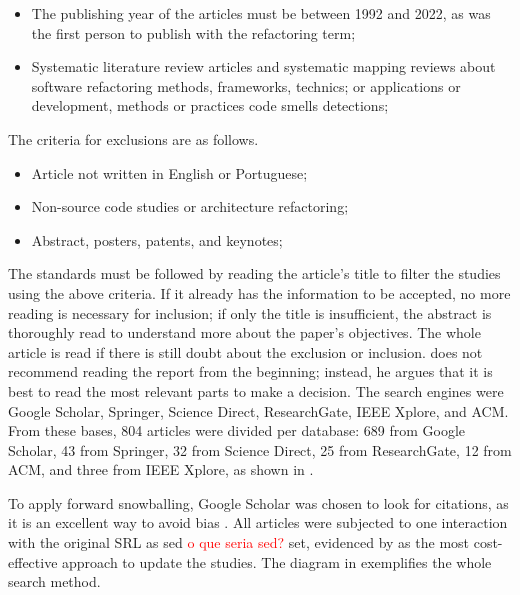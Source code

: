 \begin{itemize}
    \item The publishing year of the articles must be between 1992 and 2022, as \textcite{Opdyke1992} was the first person to publish with the refactoring term;
    \item Systematic literature review articles and systematic mapping reviews about software refactoring methods, frameworks, technics; or applications or development, methods or practices code smells detections;
\end{itemize}

The criteria for exclusions are as follows.

\begin{itemize}
    \item Article not written in English or Portuguese;
    \item Non-source code studies or architecture refactoring;
    \item Abstract, posters, patents, and keynotes;
\end{itemize}

The standards must be followed by reading the article's title to filter the studies using the above criteria. If it already has the information to be accepted, no more reading is necessary for inclusion; if only the title is insufficient, the abstract is thoroughly read to understand more about the paper's objectives. The whole article is read if there is still doubt about the exclusion or inclusion. \textcite{Wohlin2014} does not recommend reading the report from the beginning; instead, he argues that it is best to read the most relevant parts to make a decision.
The search engines were Google Scholar, Springer, Science Direct, ResearchGate, IEEE Xplore, and ACM. From these bases, 804 articles were divided per database: 689 from Google Scholar, 43 from Springer, 32 from Science Direct, 25 from ResearchGate, 12 from ACM, and three from IEEE Xplore, as shown in .

To apply forward snowballing, Google Scholar was chosen to look for citations, as it is an excellent way to avoid bias \cite{Wohlin2014}. All articles were subjected to one interaction with the original SRL as sed \textcolor{red}{o que seria sed?} set, evidenced by \textcite{Wohlin2020} as the most cost-effective approach to update the studies. The diagram in  exemplifies the whole search method. 

